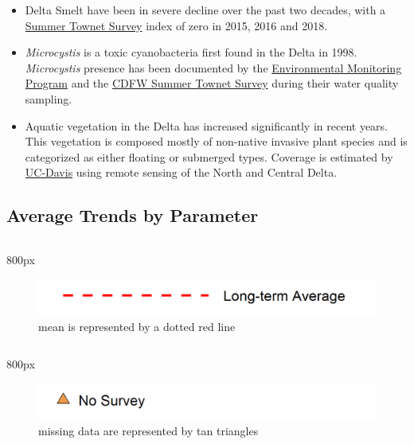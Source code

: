 \documentclass[
]{book}
\providecommand{\tightlist}{%
  \setlength{\itemsep}{0pt}\setlength{\parskip}{0pt}}
\begin{document}
\begin{itemize}
\tightlist
\item
  Delta Smelt have been in severe decline over the past two decades, with a \href{https://wildlife.ca.gov/Conservation/Delta/Townet-Survey}{Summer Townet Survey} index of zero in 2015, 2016 and 2018.
\item
  \emph{Microcystis} is a toxic cyanobacteria first found in the Delta in 1998. \emph{Microcystis} presence has been documented by the \href{https://emp.baydeltalive.com/wiki/12297}{Environmental Monitoring Program} and the \href{https://wildlife.ca.gov/Conservation/Delta/Townet-Survey}{CDFW Summer Townet Survey} during their water quality sampling.
\item
  Aquatic vegetation in the Delta has increased significantly in recent years. This vegetation is composed mostly of non-native invasive plant species and is categorized as either floating or submerged types. Coverage is estimated by \href{http://cstars.metro.ucdavis.edu/}{UC-Davis} using remote sensing of the North and Central Delta.
\end{itemize}

\hypertarget{average-trends-by-parameter}{%
\subsection{Average Trends by Parameter}\label{average-trends-by-parameter}}

\begin{column}{800px\textwidth}
\begin{figure}
\includegraphics[width=15.25in]{figures/mline} \caption{mean is represented by a dotted red line}\label{fig:unnamed-chunk-83}
\end{figure}
\end{column}

\begin{column}{800px\textwidth}
\begin{figure}
\includegraphics[width=15.25in]{figures/mpoint} \caption{missing data are represented by tan triangles}\label{fig:unnamed-chunk-84}
\end{figure}
\end{column}
\end{document}
